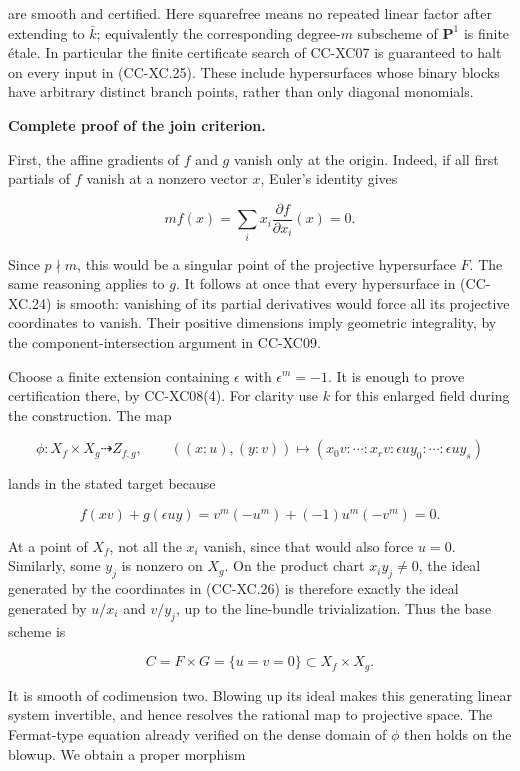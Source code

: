are smooth and certified. Here squarefree means no repeated linear
factor after extending to \(\bar k\); equivalently the corresponding
degree-\(m\) subscheme of \(\mathbf P^1\) is finite étale. In particular
the finite certificate search of CC-XC07 is guaranteed to halt on every
input in (CC-XC.25). These include hypersurfaces whose binary blocks
have arbitrary distinct branch points, rather than only diagonal
monomials.

\textbf{Complete proof of the join criterion.}

First, the affine gradients of \(f\) and \(g\) vanish only at the
origin. Indeed, if all first partials of \(f\) vanish at a nonzero
vector \(x\), Euler's identity gives

\[
 m f(x)=\sum_i x_i\frac{\partial f}{\partial x_i}(x)=0.
\]

Since \(p\nmid m\), this would be a singular point of the projective
hypersurface \(F\). The same reasoning applies to \(g\). It follows at
once that every hypersurface in (CC-XC.24) is smooth: vanishing of its
partial derivatives would force all its projective coordinates to
vanish. Their positive dimensions imply geometric integrality, by the
component-intersection argument in CC-XC09.

Choose a finite extension containing \(\epsilon\) with
\(\epsilon^m=-1\). It is enough to prove certification there, by
CC-XC08(4). For clarity use \(k\) for this enlarged field during the
construction. The map

\[
 \phi:X_f\times X_g\dashrightarrow Z_{f,g},\qquad
 ((x:u),(y:v))\longmapsto(x_0v:\cdots:x_rv:
                              \epsilon u y_0:\cdots:\epsilon u y_s)
 \tag{CC-XC.26}
\]

lands in the stated target because

\[
 f(xv)+g(\epsilon uy)
 =v^m(-u^m)+(-1)u^m(-v^m)=0.
\]

At a point of \(X_f\), not all the \(x_i\) vanish, since that would also
force \(u=0\). Similarly, some \(y_j\) is nonzero on \(X_g\). On the
product chart \(x_i y_j\ne0\), the ideal generated by the coordinates in
(CC-XC.26) is therefore exactly the ideal generated by \(u/x_i\) and
\(v/y_j\), up to the line-bundle trivialization. Thus the base scheme is

\[
 C=F\times G=\{u=v=0\}\subset X_f\times X_g.
\]

It is smooth of codimension two. Blowing up its ideal makes this
generating linear system invertible, and hence resolves the rational map
to projective space. The Fermat-type equation already verified on the
dense domain of \(\phi\) then holds on the blowup. We obtain a proper
morphism

